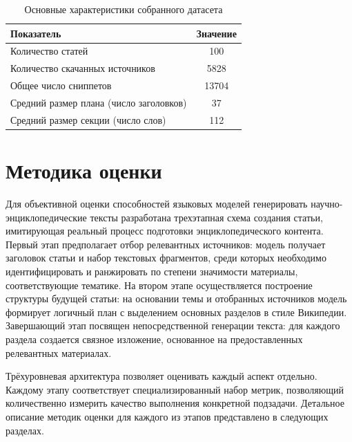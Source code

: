 \documentclass{article}
\theoremstyle{definition}
\theoremstyle{plain}
\begin{document}
\begin{table}[htb]
  \centering
  \caption{Основные характеристики собранного датасета}
  \label{tab:dataset}
  \begin{tabular}{lc}
    \hline
    \textbf{Показатель} & \textbf{Значение} \\
    \hline
    Количество статей                             & 100    \\
    \hline
    Количество скачанных источников               & 5828  \\
    \hline
    Общее число сниппетов                         & 13704  \\
    \hline
    Средний размер плана (число заголовков)       & 37    \\
    \hline
    Средний размер секции (число слов)            & 112   \\
    \hline
  \end{tabular}
\end{table}


\section*{Методика оценки}
Для объективной оценки способностей языковых моделей генерировать научно-энциклопедические тексты разработана трехэтапная схема создания статьи, имитирующая реальный процесс подготовки энциклопедического контента. 
Первый этап предполагает отбор релевантных источников: модель получает заголовок статьи и набор текстовых фрагментов, среди которых необходимо идентифицировать и ранжировать по степени значимости материалы, соответствующие тематике. 
На втором этапе осуществляется построение структуры будущей статьи: на основании темы и отобранных источников модель формирует логичный план с выделением основных разделов в стиле Википедии. 
Завершающий этап посвящен непосредственной генерации текста: для каждого раздела создается связное изложение, основанное на предоставленных релевантных материалах. 

Трёхуровневая архитектура позволяет оценивать каждый аспект отдельно.
Каждому этапу соответствует специализированный набор метрик, позволяющий количественно измерить качество выполнения конкретной подзадачи. 
Детальное описание методик оценки для каждого из этапов представлено в следующих разделах.
\end{document}
